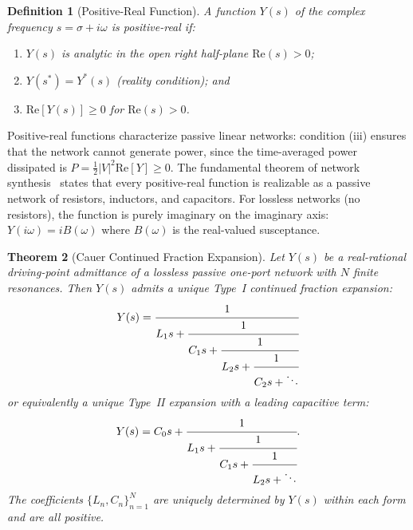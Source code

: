 \documentclass[reprint, floatfix, superscriptaddress, amsmath, amssymb, longbibliography]{revtex4-2}
\newtheorem{theorem}{Theorem}[section]
\newtheorem{definition}[theorem]{Definition}
\begin{document}
\begin{definition}[Positive-Real Function]
\label{def:positive_real}
A function $Y(s)$ of the complex frequency $s = \sigma + i\omega$ is \emph{positive-real} if:
\begin{enumerate}
    \item[(i)] $Y(s)$ is analytic in the open right half-plane $\mathrm{Re}(s) > 0$;
    \item[(ii)] $Y(s^*) = Y^*(s)$ (reality condition); and
    \item[(iii)] $\mathrm{Re}[Y(s)] \geq 0$ for $\mathrm{Re}(s) > 0$.
\end{enumerate}
\end{definition}

Positive-real functions characterize passive linear networks: condition (iii) ensures that the network cannot generate power, since the time-averaged power dissipated is $P = \frac{1}{2}|V|^2 \mathrm{Re}[Y] \geq 0$. The fundamental theorem of network synthesis~\cite{Brune1931, Guillemin1957} states that every positive-real function is realizable as a passive network of resistors, inductors, and capacitors. For lossless networks (no resistors), the function is purely imaginary on the imaginary axis: $Y(i\omega) = iB(\omega)$ where $B(\omega)$ is the real-valued susceptance.

\begin{theorem}[Cauer Continued Fraction Expansion]
\label{thm:cauer_expansion}
Let $Y(s)$ be a real-rational driving-point admittance of a lossless passive one-port network with $N$ finite resonances. Then $Y(s)$ admits a unique Type~I continued fraction expansion:
\begin{equation}
Y(s) = \cfrac{1}{L_1 s + \cfrac{1}{C_1 s + \cfrac{1}{L_2 s + \cfrac{1}{C_2 s + \ddots}}}}
\label{eq:cauer_type1}
\end{equation}
or equivalently a unique Type~II expansion with a leading capacitive term:
\begin{equation}
Y(s) = C_0 s + \cfrac{1}{L_1 s + \cfrac{1}{C_1 s + \cfrac{1}{L_2 s + \ddots}}}.
\label{eq:cauer_type2}
\end{equation}
The coefficients $\{L_n, C_n\}_{n=1}^{N}$ are uniquely determined by $Y(s)$ within each form and are all positive.
\end{theorem}
\end{document}
